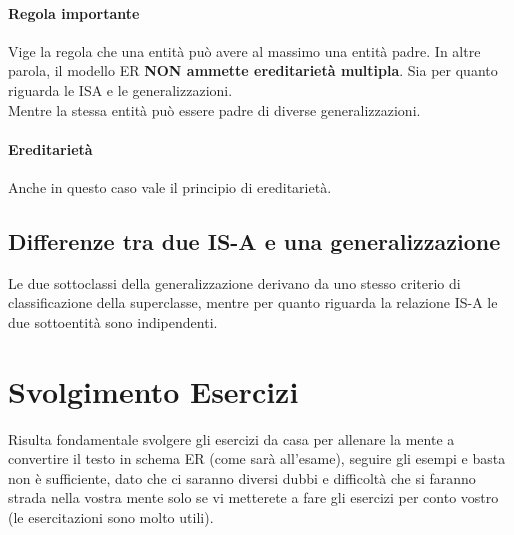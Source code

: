 \paragraph*{Regola importante} Vige la regola che una entità può avere al massimo
una entità padre. In altre parola, il modello ER \textbf{NON ammette ereditarietà multipla}.
Sia per quanto riguarda le ISA e le generalizzazioni.
\\ Mentre la stessa entità può essere padre di diverse generalizzazioni.
\paragraph*{Ereditarietà} Anche in questo caso vale il principio di ereditarietà.
\subsection*{Differenze tra due IS-A e una generalizzazione}
Le due sottoclassi della generalizzazione derivano da uno stesso criterio di
classificazione della superclasse, mentre per quanto riguarda la relazione IS-A
le due sottoentità sono indipendenti.
\section{Svolgimento Esercizi}
Risulta fondamentale svolgere gli esercizi da casa per allenare la mente a convertire
il testo in schema ER (come sarà all'esame), seguire gli esempi e basta non è sufficiente,
dato che ci saranno diversi dubbi e difficoltà che si faranno strada nella vostra
mente solo se vi metterete a fare gli esercizi per conto vostro (le esercitazioni
sono molto utili).

